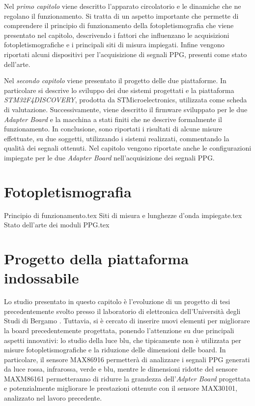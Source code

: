 \documentclass[
	a4paper,
	cleardoublepage=empty,
	headings=twolinechapter,
	numbers=autoenddot,
]{scrbook}
\begin{document}
	Nel \textit{primo capitolo} viene descritto l'apparato circolatorio e le dinamiche che ne regolano il funzionamento. Si tratta di un aspetto importante che permette di comprendere il principio di funzionamento della fotopletismografia che viene presentato nel capitolo, descrivendo i fattori che influenzano le acquisizioni fotopletismografiche e i principali siti di misura impiegati. Infine vengono riportati alcuni dispositivi per l'acquisizione di segnali PPG, presenti come stato dell'arte.
	
	Nel \textit{secondo capitolo} viene presentato il progetto delle due piattaforme. In particolare si descrive lo sviluppo dei due sistemi progettati e la piattaforma \textit{STM32F4DISCOVERY}, prodotta da STMicroelectronics, utilizzata come scheda di valutazione. Successivamente, viene descritto il firmware sviluppato per le due \textit{Adapter Board} e la macchina a stati finiti che ne descrive formalmente il funzionamento. In conclusione, sono riportati i risultati di alcune misure effettuate, su due soggetti, utilizzando i sistemi realizzati, commentando la qualità dei segnali ottenuti. Nel capitolo vengono riportate anche le configurazioni impiegate per le due \textit{Adapter Board} nell'acquisizione dei segnali PPG.
	
	\chapter{Fotopletismografia}
	{Principio di funzionamento.tex}
	{Siti di misura e lunghezze d’onda impiegate.tex}
	{Stato dell’arte dei moduli PPG.tex}
	
	\chapter{Progetto della piattaforma indossabile}
	Lo studio presentato in questo capitolo è l'evoluzione di un progetto di tesi precedentemente svolto presso il laboratorio di elettronica dell’Università degli Studi di Bergamo \cite{Ingegneria2018}. Tuttavia, si è cercato di inserire nuovi elementi per migliorare la board precedentemente progettata, ponendo l'attenzione su due principali aspetti innovativi: lo studio della luce blu, che tipicamente non è utilizzata per misure fotopletismografiche e la riduzione delle dimensioni delle board. In particolare, il sensore MAX86916 permetterà di analizzare i segnali PPG generati da luce rossa, infrarossa, verde e blu, mentre le dimensioni ridotte del sensore MAXM86161 permetteranno di ridurre la grandezza dell'\textit{Adpter Board} progettata e potenzialmente migliorare le prestazioni ottenute con il sensore MAX30101, analizzato nel lavoro precedente\cite{Ingegneria2018}.
	
\end{document}
